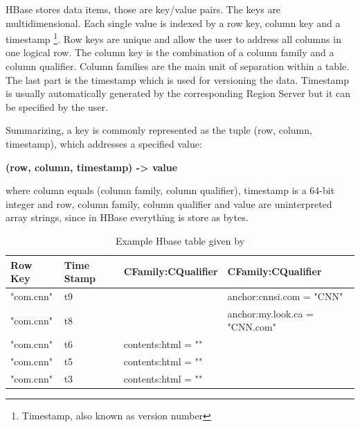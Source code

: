 HBase stores data items, those are key/value pairs. The keys are multidimensional. Each single value is indexed by a row key, column key and a timestamp \footnote{Timestamp, also known as version number}. Row keys are unique and allow the user to address all columns in one logical row. The column key is the combination of a column family and a column qualifier. Column families are the main unit of separation within a table. The last part is the timestamp which is used for versioning the data. Timestamp is usually automatically generated by the corresponding Region Server but it can be specified by the user.
\par
Summarizing, a key is commonly represented as the tuple (row, column, timestamp), which addresses a specified value:
\par
			\centerline{\textbf{(row, column, timestamp) -> value}}
\par
where column equals (column family, column qualifier), timestamp is a 64-bit integer and row, column family, column qualifier and value are uninterpreted array strings, since in HBase everything is store as bytes.

\begin{table}[htbp]
\begin{center}
\begin{tabular}{|l|l|l|l|}
\hline
\textbf{Row Key} & \textbf{Time Stamp} & \textbf{CFamily:CQualifier} & \textbf{CFamily:CQualifier} \\ \hline
"com.cnn" & t9 &   & anchor:cnnsi.com = "CNN" \\ \hline
"com.cnn" & t8 &   & anchor:my.look.ca = "CNN.com" \\ \hline
"com.cnn" & t6 & contents:html = "" &   \\ \cline{1-2}
"com.cnn" & t5 & contents:html = "" &   \\ \cline{1-2}
"com.cnn" & t3 & contents:html = "" &   \\ \hline
\end{tabular}
\end{center}
\caption{Example Hbase table given by \cite{ApacheHBaseDataModel}}
\end{table}

